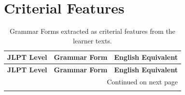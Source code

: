 \section{Criterial Features}
\begin{longtable}{p{2cm} p{4cm} p{8cm}}
\caption{Grammar Forms extracted as criterial features from the learner texts.
\label{tab:Criterial-Features}}\\
\toprule
\textbf{JLPT Level} & \textbf{Grammar Form} & \textbf{English Equivalent}  \\
\midrule
\endfirsthead

\toprule
\textbf{JLPT Level} & \textbf{Grammar Form} & \textbf{English Equivalent}\\
\midrule
\endhead

\midrule \multicolumn{3}{r}{{Continued on next page}}\\
\midrule
\endfoot

\bottomrule
\endlastfoot


\end{longtable}

